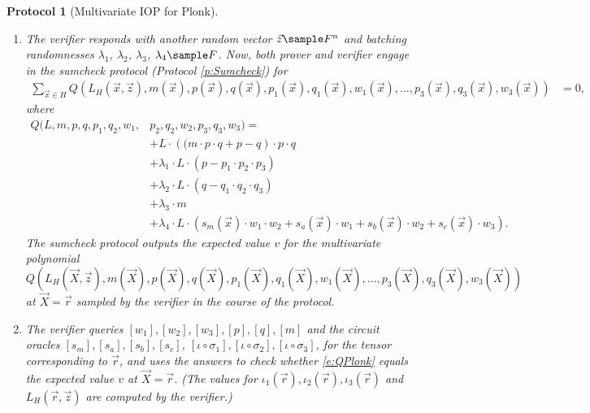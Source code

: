 \documentclass[11pt]{article}
\newtheorem{protocol}[]{Protocol}
\theoremstyle{definition}
\theoremstyle{remark}
\begin{document}
\begin{protocol}[Multivariate IOP for Plonk]
\begin{enumerate}
\item
\label{i:PAstep2}
The verifier responds with another random vector $\vec z \sample F^n$ and batching randomnesses $\lambda_1$, $\lambda_2$, $\lambda_3$, $\lambda_4\sample F$.
Now, both prover and verifier engage in the sumcheck protocol (Protocol \ref{p:Sumcheck}) for 
\begin{align*} 
	\sum_{\vec x \in H} Q(L_H(\vec x, \vec z),  m(\vec x), p(\vec x), q(\vec x), p_1(\vec x), q_1(\vec x), w_1(\vec x), \ldots, p_3(\vec x), q_3(\vec x), w_3(\vec x))&= 0,
\end{align*}
where 
\begin{equation}
\label{e:QPlonk}
\begin{aligned}
Q(L , m, p, q, p_1, q_2, w_1, &p_2, q_2, w_2,  p_3, q_3, w_3) =   
\\
& + L \cdot  \left( (m\cdot  p \cdot q + p - q\right)\cdot  p \cdot q 
\\
& + \lambda_1\cdot L\cdot (p - p_1\cdot p_2\cdot p_3)
\\
& + \lambda_2\cdot L\cdot (q - q_1\cdot q_2\cdot q_3)
\\
&+  \lambda_3 \cdot m
\\
&+ \lambda_4 \cdot L \cdot \left( s_m(\vec x)\cdot w_1\cdot w_2 + s_a(\vec x)\cdot w_1 + s_b(\vec x)\cdot w_2 + s_c(\vec x)\cdot w_3\right).
\end{aligned}
\end{equation}
The sumcheck protocol outputs the expected value $v$ for the multivariate polynomial 
\begin{equation}
Q(L_H(\vec X, \vec z),  m(\vec X), p(\vec X), q(\vec X), p_1(\vec X), q_1(\vec X), w_1(\vec X), \ldots, p_3(\vec X), q_3(\vec X), w_3(\vec X) )
\end{equation}
at $\vec X=\vec r$ sampled by the verifier in the course of the protocol.

\item
The verifier queries $[w_1], [w_2], [w_3], [p], [q], [m]$ and the circuit oracles $[s_m], [s_a], [s_b], [s_c]$, $[\iota\circ\sigma_1], [\iota\circ\sigma_2], [\iota\circ\sigma_3]$,  for the tensor corresponding to $\vec r$, and uses the answers  to check whether \eqref{e:QPlonk} equals the expected value $v$ at $\vec X = \vec r$. 
(The values for $\iota_1(\vec r), \iota_2(\vec r), \iota_3(\vec r)$ and $L_H(\vec r, \vec z)$ are computed by the verifier.)
\end{enumerate}
\end{protocol}
\end{document}
